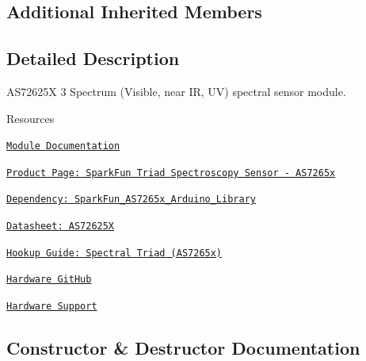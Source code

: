 \subsection*{Additional Inherited Members}


\subsection{Detailed Description}
A\+S72625X 3 Spectrum (Visible, near IR, UV) spectral sensor module. 

\begin{DoxyParagraph}{Resources}

\begin{DoxyItemize}
\item \href{https://openslab-osu.github.io/Loom/html/class_loom___a_s7265_x.html}{\tt Module Documentation}
\item \href{https://www.sparkfun.com/products/15050}{\tt Product Page\+: Spark\+Fun Triad Spectroscopy Sensor -\/ A\+S7265x}
\item \href{https://github.com/sparkfun/SparkFun_AS7265x_Arduino_Library}{\tt Dependency\+: Spark\+Fun\+\_\+\+A\+S7265x\+\_\+\+Arduino\+\_\+\+Library}
\item \href{https://cdn.sparkfun.com/assets/c/2/9/0/a/AS7265x_Datasheet.pdf}{\tt Datasheet\+: A\+S72625X}
\item \href{https://learn.sparkfun.com/tutorials/spectral-triad-as7265x-hookup-guide}{\tt Hookup Guide\+: Spectral Triad (A\+S7265x)}
\item \href{https://github.com/sparkfun/Qwiic_Spectral_Sensor_AS7265x}{\tt Hardware Git\+Hub}
\item \href{https://github.com/OPEnSLab-OSU/Loom/wiki/Hardware-Support#as7265x-spectral-sensor-triad-visible-near-infrared-ultraviolet}{\tt Hardware Support} 
\end{DoxyItemize}
\end{DoxyParagraph}


\subsection{Constructor \& Destructor Documentation}
